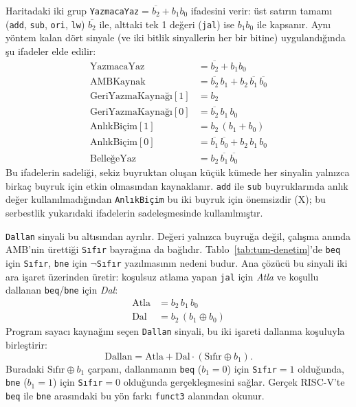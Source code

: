Haritadaki iki grup \texttt{YazmacaYaz}$=\overline{b_2}+b_1 b_0$ ifadesini verir: üst satırın tamamı (\texttt{add}, \texttt{sub}, \texttt{ori}, \texttt{lw}) $\overline{b_2}$ ile, alttaki tek 1 değeri (\texttt{jal}) ise $b_1 b_0$ ile kapsanır. Aynı yöntem kalan dört sinyale (ve iki bitlik sinyallerin her bir bitine) uygulandığında şu ifadeler elde edilir:
\begin{align*}
\text{YazmacaYaz} &= \overline{b_2} + b_1 b_0 \\
\text{AMBKaynak} &= \overline{b_2}\,b_1 + b_2\,\overline{b_1}\,\overline{b_0} \\
\text{GeriYazmaKaynağı}[1] &= b_2 \\
\text{GeriYazmaKaynağı}[0] &= \overline{b_2}\,b_1\,b_0 \\
\text{AnlıkBiçim}[1] &= b_2\,(b_1 + b_0) \\
\text{AnlıkBiçim}[0] &= \overline{b_1}\,\overline{b_0} + b_2\,b_1\,b_0 \\
\text{BelleğeYaz} &= b_2\,\overline{b_1}\,\overline{b_0}
\end{align*}
Bu ifadelerin sadeliği, sekiz buyruktan oluşan küçük kümede her sinyalin yalnızca birkaç buyruk için etkin olmasından kaynaklanır. \texttt{add} ile \texttt{sub} buyruklarında anlık değer kullanılmadığından \texttt{AnlıkBiçim} bu iki buyruk için önemsizdir (X); bu serbestlik yukarıdaki ifadelerin sadeleşmesinde kullanılmıştır.

\texttt{Dallan} sinyali bu altısından ayrılır. Değeri yalnızca buyruğa değil, çalışma anında AMB'nin ürettiği \texttt{Sıfır} bayrağına da bağlıdır. Tablo~\ref{tab:tum-denetim}'de \texttt{beq} için \texttt{Sıfır}, \texttt{bne} için $\lnot$\texttt{Sıfır} yazılmasının nedeni budur. Ana çözücü bu sinyali iki ara işaret üzerinden üretir: koşulsuz atlama yapan \texttt{jal} için \emph{Atla} ve koşullu dallanan \texttt{beq}/\texttt{bne} için \emph{Dal}:
\begin{align*}
\text{Atla} &= b_2\,b_1\,b_0 \\
\text{Dal} &= b_2\,(b_1 \oplus b_0)
\end{align*}
Program sayacı kaynağını seçen \texttt{Dallan} sinyali, bu iki işareti dallanma koşuluyla birleştirir:
\[
\text{Dallan} = \text{Atla} + \text{Dal}\cdot(\text{Sıfır} \oplus b_1).
\]
Buradaki $\text{Sıfır} \oplus b_1$ çarpanı, dallanmanın \texttt{beq} ($b_1=0$) için \texttt{Sıfır}$=1$ olduğunda, \texttt{bne} ($b_1=1$) için \texttt{Sıfır}$=0$ olduğunda gerçekleşmesini sağlar. Gerçek RISC-V'te \texttt{beq} ile \texttt{bne} arasındaki bu yön farkı \texttt{funct3} alanından okunur.

